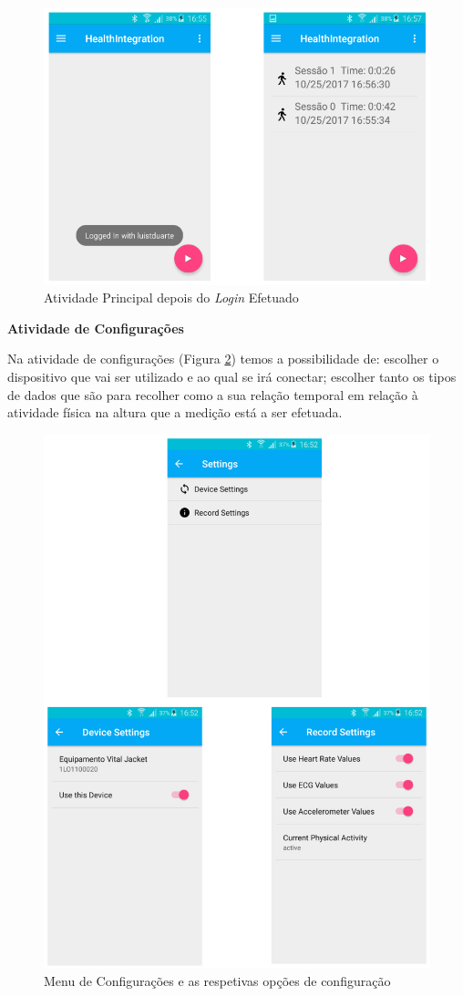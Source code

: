 \begin{figure}[H]
\centering
\includegraphics[height=0.4\textwidth]{imgs/afterlogin.png}
\caption[Atividade Principal depois do \textit{Login} Efetuado]{Atividade Principal depois do \textit{Login} Efetuado}
\label{f:afterlogin}
\end{figure}

\par
\textbf{Atividade de Configurações}
\par
Na atividade de configurações (Figura \ref{f:settings}) temos a possibilidade de: escolher o dispositivo que vai ser utilizado e ao qual se irá conectar; escolher tanto os tipos de dados que são para recolher como a sua relação temporal em relação à atividade física na altura que a medição está a ser efetuada.
\begin{figure}[H]
\centering
\includegraphics[height=0.6\textwidth]{imgs/settings.png}
\caption[Menu de Configurações e as respetivas opções de configuração]{Menu de Configurações e as respetivas opções de configuração}
\label{f:settings}
\end{figure}


